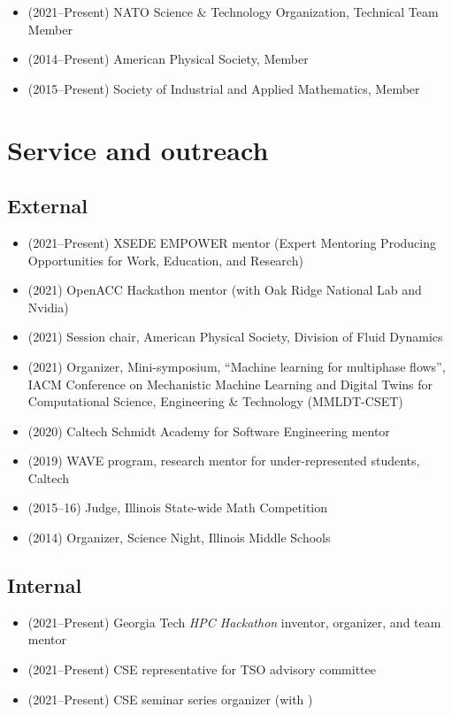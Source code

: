 \begin{itemize}
    \item (2021--Present) NATO Science \& Technology Organization, Technical Team Member
    \item (2014--Present) American Physical Society, Member
    \item (2015--Present) Society of Industrial and Applied Mathematics, Member
\end{itemize}

\section{Service and outreach}

\subsection{External}
\begin{itemize}

    \item (2021--Present) XSEDE EMPOWER mentor (Expert Mentoring Producing Opportunities for Work, Education, and Research)
    \item (2021) OpenACC Hackathon mentor (with Oak Ridge National Lab and Nvidia)
    \item (2021) Session chair, American Physical Society, Division of Fluid Dynamics
    \item (2021) Organizer, Mini-symposium, ``Machine learning for multiphase flows'', IACM Conference on Mechanistic Machine Learning and Digital Twins for Computational Science, Engineering \& Technology (MMLDT-CSET)
    \item (2020) Caltech Schmidt Academy for Software Engineering mentor
    \item (2019) WAVE program, research mentor for under-represented students, Caltech
    \item (2015--16) Judge, Illinois State-wide Math Competition
    \item (2014) Organizer, Science Night, Illinois Middle Schools
\end{itemize}

\subsection{Internal}
\begin{itemize}
    \item (2021--Present) Georgia Tech \textit{HPC Hackathon} inventor, organizer, and team mentor
    \item (2021--Present) CSE representative for TSO advisory committee
    \item (2021--Present) CSE seminar series organizer (with \Florian)
\end{itemize}

